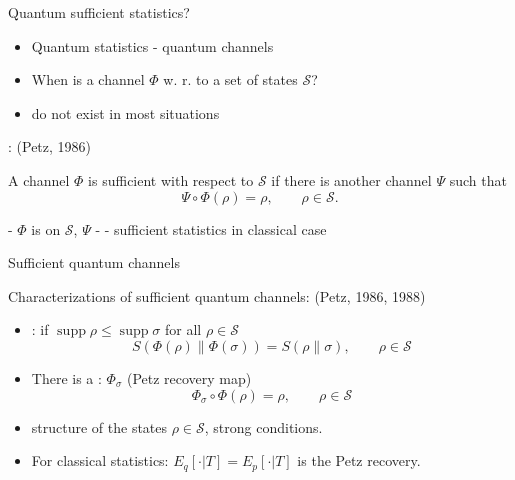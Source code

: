 \documentclass[mathserif]{beamer}
\newcommand{\<}{\langle}
\renewcommand{\>}{\rangle}
\newcommand{\supp}{\operatorname{supp}}
\newcommand{\Se}{\mathcal S}
\begin{document}
\begin{frame}{Quantum sufficient statistics?}

\begin{itemize}

\item Quantum statistics - quantum channels
\vskip 3mm
\item When is a channel $\Phi$  w. r. to a set of states
$\mathcal S$?
\vskip 3mm
\item {} do not exist in most situations


\end{itemize}

\bigskip 

: {\small (Petz, 1986)}

\medskip 
A channel $\Phi$ is sufficient with respect to $\mathcal S$ if there is another channel
$\Psi$ such that 
\[
\Psi\circ\Phi(\rho)=\rho,\qquad \rho\in \Se.
\]

- $\Phi$ is  on $\Se$, $\Psi$ - 
\vskip 2mm
- sufficient statistics in classical case

\end{frame}

\begin{frame}{Sufficient quantum channels}

Characterizations of sufficient quantum channels: {\small (Petz, 1986, 1988)}

\bigskip
\begin{itemize}
\item {}: if $\supp \rho\le \supp \sigma$ for all $\rho\in \Se$
\[
S(\Phi(\rho)\|\Phi(\sigma))=S(\rho\|\sigma),\qquad \rho\in \Se
\]
\item There is a :  $\Phi_\sigma$ (Petz recovery map)
\[
\Phi_\sigma\circ \Phi(\rho)=\rho,\qquad \rho\in  \Se
\]
\item structure of the states $\rho\in \Se$, strong conditions.
\vskip 3mm

\item For classical statistics: $E_q[\cdot|T]=E_p[\cdot|T]$ is the Petz recovery.


\end{itemize}



\end{frame}
\end{document}
